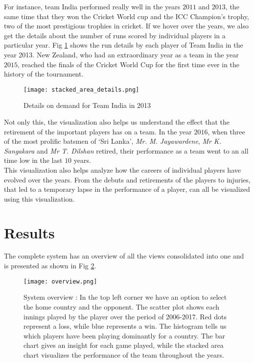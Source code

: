 \documentclass[10pt,journal,compsoc]{IEEEtran}
\begin{document}
\indent For instance, team India performed really well in the years $2011$ and $2013$, the same time that they won the Cricket World cup and the ICC Champion’s trophy, two of the most prestigious trophies in cricket. If we hover over the years, we also get the details about the number of runs scored by individual players in a particular year. Fig \ref{fig:stacked_area_details} shows the run details by each player of Team India in the year 2013. New Zealand, who had an extraordinary year as a team in the year $2015$, reached the finals of the Cricket World Cup for the first time ever in the history of the tournament.\\

\begin{figure}[ht]
\texttt{[image: stacked\_area\_details.png]}
\caption{Details on demand for Team India in 2013}
\label{fig:stacked_area_details}
\end{figure}

\indent Not only this, the visualization also helps us understand the effect that the retirement of the important players has on a team. In the year $2016$, when three of the most prolific batsmen of `Sri Lanka', \textit{Mr. M. Jayawardene}, \textit{Mr K. Sangakara} and \textit{Mr T. Dilshan} retired, their performance as a team went to an all time low in the last $10$ years.\\

\indent This visualization also helps analyze how the careers of individual players have evolved over the years. From the debuts and retirements of the players to injuries, that led to a temporary lapse in the performance of a player, can all be visualized using this visualization.

\section {Results}
The complete system has an overview of all the views consolidated into one and is presented as shown in Fig \ref{fig:overview}.

\begin{figure}[ht]
\texttt{[image: overview.png]}
\caption{System overview : In the top left corner we have an option to select the home country and the opponent. The scatter plot shows each innings played by the player over the period of 2006-2017. Red dots represent a loss, while blue represents a win. The histogram tells us which players have been playing dominantly for a country. The bar chart gives an insight for each game played, while the stacked area chart visualizes the performance of the team throughout the years.}
\label{fig:overview}
\end{figure}
\end{document}
